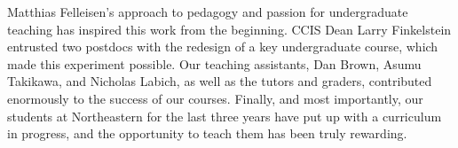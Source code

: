 \documentclass[submission,copyright]{eptcs}
\begin{document}
Matthias Felleisen's approach to pedagogy and passion for
undergraduate teaching has inspired this work from the beginning.
CCIS Dean Larry Finkelstein entrusted two postdocs with the redesign
of a key undergraduate course, which made this experiment possible.
Our teaching assistants, Dan Brown, Asumu Takikawa, and Nicholas
Labich, as well as the tutors and graders, contributed enormously to
the success of our courses. Finally, and most importantly, our
students at Northeastern for the last three years have put up with a
curriculum in progress, and the opportunity to teach them has been
truly rewarding.



\end{document}
